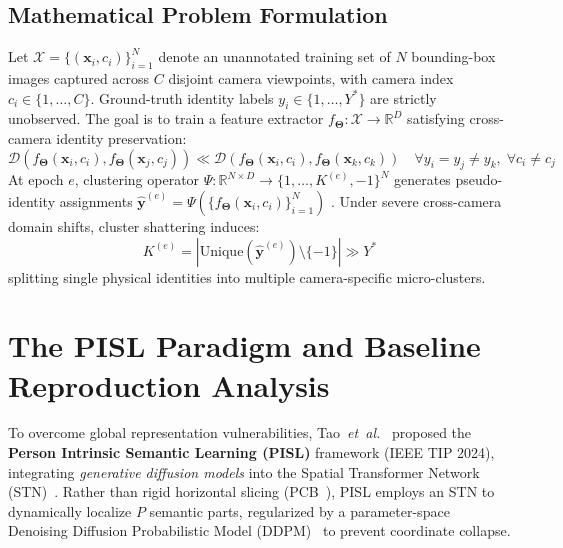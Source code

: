\subsection{Mathematical Problem Formulation}
\label{subsec:math_formulation}

Let $\mathcal{X} = \{(\mathbf{x}_i, c_i)\}_{i=1}^N$ denote an unannotated training set of $N$ bounding-box images captured across $C$ disjoint camera viewpoints, with camera index $c_i \in \{1, \dots, C\}$. Ground-truth identity labels $y_i \in \{1, \dots, Y^*\}$ are strictly unobserved. The goal is to train a feature extractor $f_{\mathbf{\Theta}}: \mathcal{X} \to \mathbb{R}^D$ satisfying cross-camera identity preservation:
\begin{equation}
\label{eq:reid_objective}
\mathcal{D}\left(f_{\mathbf{\Theta}}(\mathbf{x}_i, c_i), f_{\mathbf{\Theta}}(\mathbf{x}_j, c_j)\right) \ll \mathcal{D}\left(f_{\mathbf{\Theta}}(\mathbf{x}_i, c_i), f_{\mathbf{\Theta}}(\mathbf{x}_k, c_k)\right) \quad \forall y_i = y_j \neq y_k, \; \forall c_i \neq c_j
\end{equation}
At epoch $e$, clustering operator $\Psi: \mathbb{R}^{N \times D} \to \{1, \dots, K^{(e)}, -1\}^N$ generates pseudo-identity assignments $\hat{\mathbf{y}}^{(e)} = \Psi(\{f_{\mathbf{\Theta}}(\mathbf{x}_i, c_i)\}_{i=1}^N)$ \label{eq:clustering_operator}. Under severe cross-camera domain shifts, cluster shattering induces:
\begin{equation}
\label{eq:cluster_shattering}
K^{(e)} = \left|\mathrm{Unique}\left(\hat{\mathbf{y}}^{(e)}\right) \setminus \{-1\}\right| \gg Y^*
\end{equation}
splitting single physical identities into multiple camera-specific micro-clusters.

\section{The PISL Paradigm and Baseline Reproduction Analysis}
\label{sec:pisl_paradigm}

To overcome global representation vulnerabilities, Tao~\textit{et~al.}~\cite{tao2024unsupervised} proposed the \textbf{Person Intrinsic Semantic Learning (PISL)} framework (IEEE TIP 2024), integrating \textit{generative diffusion models} into the Spatial Transformer Network (STN)~\cite{jaderberg2015spatial}. Rather than rigid horizontal slicing (PCB~\cite{sun2018beyond}), PISL employs an STN to dynamically localize $P$ semantic parts, regularized by a parameter-space Denoising Diffusion Probabilistic Model (DDPM)~\cite{ho2020denoising} to prevent coordinate collapse.

